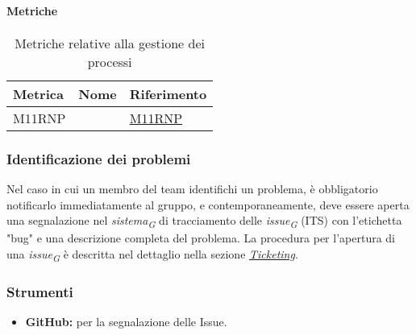 \paragraph{Metriche}
\begin{table}[H]
    \centering
    \begin{tabular}{|C{3cm}|C{4cm}|C{3cm}|}
    \hline
    \textbf{Metrica} & \textbf{Nome} & \textbf{Riferimento} \\
    \hline \hline
    M11RNP &  &  \hyperlink{item:M11RNP}{M11RNP}\\ 
    \hline
    \end{tabular}
    \caption{Metriche relative alla gestione dei processi}
\end{table}

\subsubsection{Identificazione dei problemi}
Nel caso in cui un membro del team identifichi un problema, è obbligatorio notificarlo immediatamente al gruppo, e contemporaneamente, deve essere aperta una segnalazione nel \textit{sistema}\textsubscript{\textit{G}} di tracciamento delle \textit{issue}\textsubscript{\textit{G}} (ITS) con l'etichetta "bug" e una descrizione completa del problema. La procedura per l'apertura di una \textit{issue}\textsubscript{\textit{G}} è descritta nel dettaglio nella sezione \hyperlink{par:ticketing}{\textit{Ticketing}}.

\subsubsection{Strumenti}
\begin{itemize}
    \item \textbf{GitHub:} per la segnalazione delle Issue.
\end{itemize}